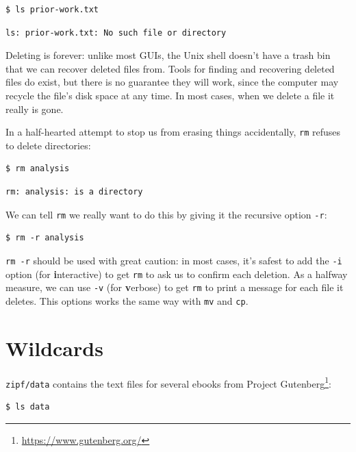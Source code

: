\documentclass[
]{krantz}
\renewcommand{\href}[2]{#2\footnote{\url{#1}}}
\begin{document}
\begin{verbatim}
$ ls prior-work.txt
\end{verbatim}

\begin{verbatim}
ls: prior-work.txt: No such file or directory
\end{verbatim}

Deleting is forever:
unlike most GUIs,
the Unix shell doesn't have a trash bin that we can recover deleted files from.
Tools for finding and recovering deleted files do exist,
but there is no guarantee they will work,
since the computer may recycle the file's disk space at any time.
In most cases,
when we delete a file it really is gone.

In a half-hearted attempt to stop us from erasing things accidentally,
\texttt{rm} refuses to delete directories:

\begin{verbatim}
$ rm analysis
\end{verbatim}

\begin{verbatim}
rm: analysis: is a directory
\end{verbatim}

We can tell \texttt{rm} we really want to do this
by giving it the recursive option \texttt{-r}:

\begin{verbatim}
$ rm -r analysis
\end{verbatim}

\texttt{rm\ -r} should be used with great caution:
in most cases,
it's safest to add the \texttt{-i} option (for \textbf{i}nteractive)
to get \texttt{rm} to ask us to confirm each deletion.
As a halfway measure,
we can use \texttt{-v} (for \textbf{v}erbose)
to get \texttt{rm} to print a message for each file it deletes.
This options works the same way with \texttt{mv} and \texttt{cp}.

\hypertarget{bash-basics-wildcard}{%
\section{Wildcards}\label{bash-basics-wildcard}}

\texttt{zipf/data} contains the text files for several ebooks
from \href{https://www.gutenberg.org/}{Project Gutenberg}:

\begin{verbatim}
$ ls data
\end{verbatim}
\end{document}
